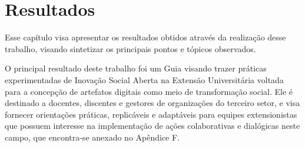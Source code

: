 \chapter{Resultados}
\label{chap:resultados}

Esse capítulo visa apresentar os resultados obtidos através da realização desse trabalho, visando sintetizar os principais pontos e tópicos observados.



O principal resultado deste trabalho foi um Guia visando trazer práticas experimentadas de Inovação Social Aberta na Extensão Universitária voltada para a concepção de artefatos digitais como meio de transformação social. Ele é destinado a docentes, discentes e gestores de organizações do terceiro setor, e visa fornecer orientações práticas, replicáveis e adaptáveis para equipes extensionistas que possuem interesse na implementação de ações colaborativas e dialógicas neste campo, que encontra-se anexado no Apêndice F.

